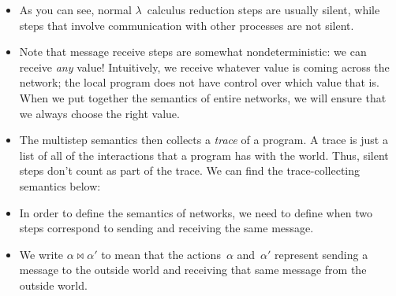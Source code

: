 \documentclass{lecturenotes}
\newcommand{\senda}[2]{#1 \rightsquigarrow #2}
\newcommand{\recva}[2]{#1 \leftsquigarrow #2}
\newcommand{\choosea}[2]{[#1] \rightsquigarrow #2}
\newcommand{\letchoosea}[2]{[#1] \leftsquigarrow #2}
\newcommand{\tracecollect}[2]{\ensuremath{\mathrel{{\xrightarrow{#1}}^{\raisebox{-5pt}{\scriptsize \ast}}}}}
\newcommand{\emptytracecollect}{\ensuremath{\mathrel{{\xrightarrow{\cdot}}^{\raisebox{-2pt}{\scriptsize \ast}}}}}
\begin{document}
\begin{itemize}
\item As you can see, normal $\lambda$~calculus reduction steps are usually silent, while steps that involve communication with other processes are not silent.
\item Note that message receive steps are somewhat nondeterministic: we can receive \emph{any} value!
 Intuitively, we receive whatever value is coming across the network; the local program does not have control over which value that is.
 When we put together the semantics of entire networks, we will ensure that we always choose the right value.
\item The multistep semantics then collects a \emph{trace} of a program.
  A trace is just a list of all of the interactions that a program has with the world.
  Thus, silent steps don't count as part of the trace.
  We can find the trace-collecting semantics below:
\end{itemize}


\begin{itemize}
\item In order to define the semantics of networks, we need to define when two steps correspond to sending and receiving the same message.
\item We write $\alpha \bowtie \alpha'$ to mean that the actions~$\alpha$ and~$\alpha'$ represent sending a message to the outside world and receiving that same message from the outside world.
\end{itemize}

\end{document}
